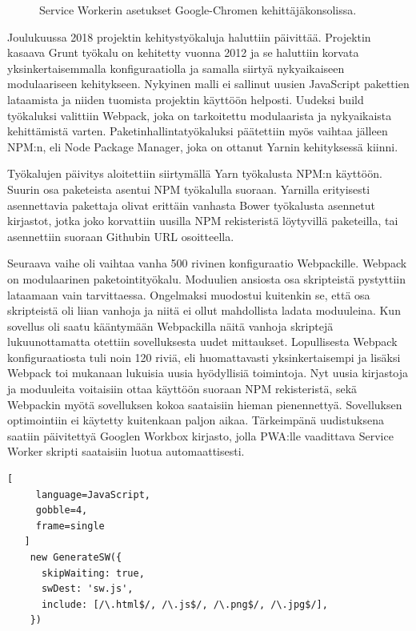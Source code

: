 \documentclass{tktltiki}
\begin{document}
\begin{figure}[h]
\begin{center}
\caption{Service Workerin asetukset Google-Chromen kehittäjäkonsolissa.}
\label{Service Worker}
\end{center}
\end{figure}

Joulukuussa 2018 projektin kehitystyökaluja haluttiin päivittää. Projektin kasaava Grunt työkalu on kehitetty vuonna 2012 ja se haluttiin korvata yksinkertaisemmalla konfiguraatiolla ja samalla siirtyä nykyaikaiseen modulaariseen kehitykseen. Nykyinen malli ei sallinut uusien JavaScript pakettien lataamista ja niiden tuomista projektin käyttöön helposti. Uudeksi build työkaluksi valittiin Webpack, joka on tarkoitettu modulaarista ja nykyaikaista kehittämistä varten. Paketinhallintatyökaluksi päätettiin myös vaihtaa jälleen NPM:n, eli Node Package Manager, joka on ottanut Yarnin kehityksessä kiinni. 

Työkalujen päivitys aloitettiin siirtymällä Yarn työkalusta NPM:n käyttöön. Suurin osa paketeista asentui NPM työkalulla suoraan. Yarnilla erityisesti asennettavia pakettaja olivat erittäin vanhasta Bower työkalusta asennetut kirjastot, jotka joko korvattiin uusilla NPM rekisteristä löytyvillä paketeilla, tai asennettiin suoraan Githubin URL osoitteella. 

Seuraava vaihe oli vaihtaa vanha 500 rivinen konfiguraatio Webpackille. Webpack on modulaarinen paketointityökalu. Moduulien ansiosta osa skripteistä pystyttiin lataamaan vain tarvittaessa. Ongelmaksi muodostui kuitenkin se, että osa skripteistä oli liian vanhoja ja niitä ei ollut mahdollista ladata moduuleina. Kun sovellus oli saatu kääntymään Webpackilla näitä vanhoja skriptejä lukuunottamatta otettiin sovelluksesta uudet mittaukset. Lopullisesta Webpack konfiguraatiosta tuli noin 120 riviä, eli huomattavasti yksinkertaisempi ja lisäksi Webpack toi mukanaan lukuisia uusia hyödyllisiä toimintoja. Nyt uusia kirjastoja ja moduuleita voitaisiin ottaa käyttöön suoraan NPM rekisteristä, sekä Webpackin myötä sovelluksen kokoa saataisiin hieman pienennettyä. Sovelluksen optimointiin ei käytetty kuitenkaan paljon aikaa. Tärkeimpänä uudistuksena saatiin päivitettyä Googlen Workbox kirjasto, jolla PWA:lle vaadittava Service Worker skripti saataisiin luotua automaattisesti.

\begin{lstlisting}[
     language=JavaScript,
     gobble=4,
     frame=single
   ]
    new GenerateSW({
      skipWaiting: true,
      swDest: 'sw.js',
      include: [/\.html$/, /\.js$/, /\.png$/, /\.jpg$/],
    })
\end{lstlisting}
\end{document}
